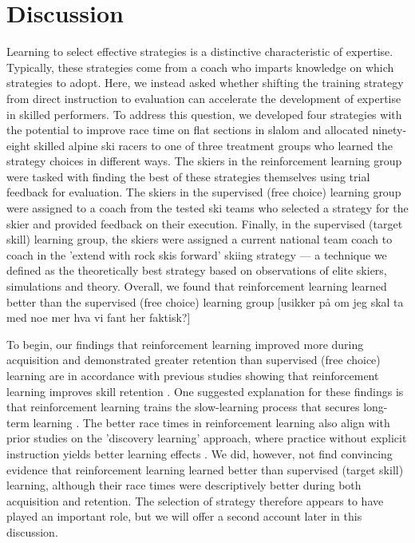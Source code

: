 \documentclass[pdflatex,sn-mathphys-num]{sn-jnl}%
\theoremstyle{thmstyleone}%
\theoremstyle{thmstyletwo}%
\theoremstyle{thmstylethree}%
\begin{document}
\section{Discussion}

Learning to select effective strategies is a distinctive characteristic of expertise. Typically, these strategies come from a coach who imparts knowledge on which strategies to adopt. Here, we instead asked whether shifting the training strategy from direct instruction to evaluation can accelerate the development of expertise in skilled performers. To address this question, we developed four strategies with the potential to improve race time on flat sections in slalom and allocated ninety-eight skilled alpine ski racers to one of three treatment groups who learned the strategy choices in different ways. The skiers in the reinforcement learning group were tasked with finding the best of these strategies themselves using trial feedback for evaluation. The skiers in the supervised (free choice) learning group were assigned to a coach from the tested ski teams who selected a strategy for the skier and provided feedback on their execution. Finally, in the supervised (target skill) learning group, the skiers were assigned a current national team coach to coach in the 'extend with rock skis forward' skiing strategy — a technique we defined as the theoretically best strategy based on observations of elite skiers, simulations and theory. Overall, we found that reinforcement learning learned better than the supervised (free choice) learning group [usikker på om jeg skal ta med noe mer hva vi fant her faktisk?]

To begin, our findings that reinforcement learning improved more during acquisition and demonstrated greater retention than supervised (free choice) learning are in accordance with previous studies showing that reinforcement learning improves skill retention \cite{therrien_effective_2016, truong_error-based_2023, hasson_reinforcement_2015}. One suggested explanation for these findings is that reinforcement learning trains the slow-learning process that secures long-term learning \cite{huang_rethinking_2011}. The better race times in reinforcement learning also align with prior studies on the 'discovery learning' approach, where practice without explicit instruction yields better learning effects \cite{wulf_instructions_1997, hodges_learning_2001, hodges_role_1999}. We did, however, not find convincing evidence that reinforcement learning learned better than supervised (target skill) learning, although their race times were descriptively better during both acquisition and retention. The selection of strategy therefore appears to have played an important role, but we will offer a second account later in this discussion.
\end{document}

